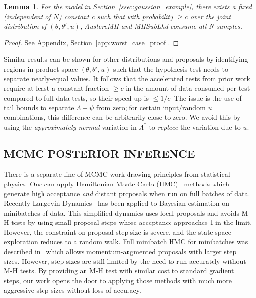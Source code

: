 \documentclass[letterpaper]{article}
\newtheorem{lemma}{Lemma}
\begin{document}
\begin{lemma}\label{lem:worst_case}
    For the model in Section~\ref{ssec:gaussian_example}, there exists a fixed
    (independent of $N$) constant $c$ such that with probability $\geq c$ over
    the joint distribution of $(\theta, \theta', u)$, {\sc AustereMH} and {\sc
    MHSubLhd} consume all $N$ samples. 
\end{lemma}
\vspace{-1em}
\begin{proof}
See Appendix, Section~\ref{app:worst_case_proof}.
\end{proof}
Similar results can be shown for other distributions and proposals by
identifying regions in product space $(\theta,\theta',u)$ such that the
hypothesis test needs to separate nearly-equal values.  It follows that the
accelerated tests from prior work require at least a constant fraction $\geq c$
in the amount of data consumed per test compared to full-data tests, so their
speed-up is $\le 1/c$. The issue is the use of tail bounds to separate $\Lambda-\psi$
from zero; for certain input/random $u$ combinations, this difference can be
arbitrarily close to zero. We avoid this by using the {\em approximately normal}
variation in $\Lambda^*$ to {\em replace} the variation due to $u$. 

\subsection{MCMC POSTERIOR INFERENCE}
There is a separate line of MCMC work drawing principles from statistical
physics. One can apply Hamiltonian Monte Carlo
(HMC)~\citep{mcmc_hamiltonian_2010} methods which generate high acceptance
\emph{and} distant proposals when run on full batches of data. Recently Langevin
Dynamics~\citep{langevin_2011,conf/icml/AhnBW12} has been applied to Bayesian
estimation on minibatches of data. This simplified dynamics uses local proposals
and avoids M-H tests by using small proposal steps whose acceptance approaches 1
in the limit. However, the constraint on proposal step size is severe, and the
state space exploration reduces to a random walk.  Full minibatch HMC for
minibatches was described in~\citep{sghmc_2014} which allows momentum-augmented
proposals with larger step sizes. However, step sizes are still limited by the
need to run accurately without M-H tests.  By providing an M-H test with similar
cost to standard gradient steps, our work opens the door to applying those
methods with much more aggressive step sizes without loss of accuracy. 
\end{document}
